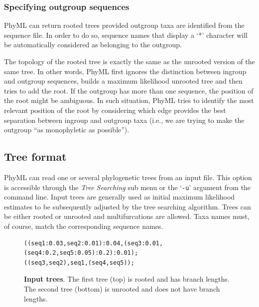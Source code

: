 \documentclass[a4paper,12pt]{article}
\newcommand{\x}[1]{\texttt{#1}}
\begin{document}
\subsubsection{Specifying outgroup sequences}\label{sec:outgroupspecify}

PhyML can return rooted trees provided outgroup taxa are identified from the sequence file. In
order to do so, sequence names that display a `*' character will be automatically considered as
belonging to the outgroup.

The topology of  the rooted tree is  exactly the same as the  unrooted version of the  same tree. In
other words,  PhyML first ignores the distinction  between ingroup and outgroup  sequences, builds a
maximum likelihood unrooted tree  and then tries to add the root. If the  outgroup has more than one
sequence, the position  of the root might be  ambiguous. In such situation, PhyML  tries to identify
the  most relevant  position of  the root  by considering  which edge  provides the  best separation
between ingroup  and outgroup taxa (i.e.,  we are trying to  make the outgroup  ``as monophyletic as
possible'').

\subsection{Tree format}

PhyML can  read one or  several phylogenetic trees  from an input  file.  This option  is accessible
through the  {\em Tree Searching} sub  menu or the `\x{-u}'  argument from the  command line.  Input
trees are generally used as initial maximum  likelihood estimates to be subsequently adjusted by the
tree searching algorithm.   Trees can be either rooted or unrooted  and multifurcations are allowed.
Taxa names must, of course, match the corresponding sequence names.

\begin{figure}[h]
\begin{small}
\begin{minipage}{\textwidth}
\begin{verbatim}
((seq1:0.03,seq2:0.01):0.04,(seq3:0.01,(seq4:0.2,seq5:0.05):0.2):0.01);
((seq3,seq2),seq1,(seq4,seq5));
\end{verbatim}
\end{minipage}
\end{small}
\caption{{\bf Input trees}. The first tree (top) is rooted and has branch lengths. The second tree
  (bottom) is unrooted and does not have branch lengths.}
\label{fig:trees}
\end{figure}
\end{document}

